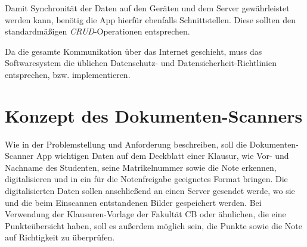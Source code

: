 \documentclass[nomenclature, 150]{HSMW-Thesis}
\begin{document}
	Damit Synchronität der Daten auf den Geräten und dem Server gewährleistet werden kann, benötig die App hierfür ebenfalls Schnittstellen. Diese sollten den standardmäßigen \textit{CRUD}-Operationen entsprechen. 
	
	Da die gesamte Kommunikation über das Internet geschieht, muss das Softwaresystem die üblichen Datenschutz- und Datensicherheit-Richtlinien entsprechen, bzw. implementieren.
	


\chapter{Konzept des Dokumenten-Scanners}

	Wie in der Problemstellung und Anforderung beschreiben, soll die Dokumenten-Scanner App wichtigen Daten auf dem Deckblatt einer Klausur, wie Vor- und Nachname des Studenten, seine Matrikelnummer sowie die Note erkennen, digitalisieren und in ein für die Notenfreigabe geeignetes Format bringen. Die digitalisierten Daten sollen anschließend an einen Server gesendet werde, wo sie und die beim Einscannen entstandenen Bilder gespeichert werden. Bei Verwendung der Klausuren-Vorlage der Fakultät CB oder ähnlichen, die eine Punkteübersicht haben, soll es außerdem möglich sein, die Punkte sowie die Note auf Richtigkeit zu überprüfen. 
\end{document}
